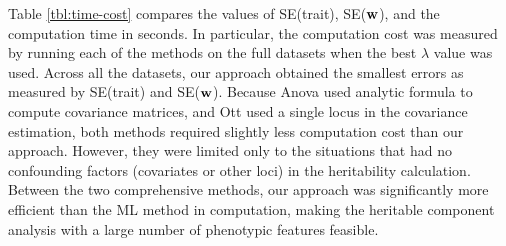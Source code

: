 \documentclass[10pt,letterpaper]{article}
\newcommand{\vect}[1]{\ensuremath\boldsymbol{\rm #1}}
\begin{document}
Table \ref{tbl:time-cost} compares the values of SE(trait), SE($\vect w$), and the computation time in seconds. In particular, the computation cost was measured by running each of the methods on the full datasets when the best $\lambda$ value was used. Across all the datasets, our approach obtained the smallest errors as measured by SE(trait) and SE($\vect w$). Because Anova used analytic formula to compute covariance matrices, and Ott used a single locus in the covariance estimation, both methods required slightly less computation cost than our approach. However, they were limited only to the situations that had no confounding factors (covariates or other loci) in the heritability calculation. Between the two comprehensive methods, our approach was significantly more efficient than the ML method in computation, making the heritable component analysis with a large number of phenotypic features feasible.  
\end{document}

